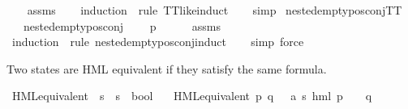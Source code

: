 \begin{isabellebody}
%
\isadelimproof
\ \ %
\endisadelimproof
%
\isatagproof
{}\isamarkupfalse%
\ assms\isanewline
\ \ \isamarkupfalse%
\ {\isacharparenleft}{\kern0pt}induction\ {\isasymphi}\ rule{\isacharcolon}{\kern0pt}\ TT{\isacharunderscore}{\kern0pt}like{\isachardot}{\kern0pt}induct{\isacharparenright}{\kern0pt}\isanewline
\ \ \isamarkupfalse%
\ simp{\isacharplus}{\kern0pt}%
\endisatagproof
{\isafoldproof}%
%
\isadelimproof
\isanewline
%
\endisadelimproof
\isanewline
{}\isamarkupfalse%
\ nested{\isacharunderscore}{\kern0pt}empty{\isacharunderscore}{\kern0pt}pos{\isacharunderscore}{\kern0pt}conj{\isacharunderscore}{\kern0pt}TT{\isacharcolon}{\kern0pt}\isanewline
\ \ \ {\isachardoublequoteopen}nested{\isacharunderscore}{\kern0pt}empty{\isacharunderscore}{\kern0pt}pos{\isacharunderscore}{\kern0pt}conj\ {\isasymphi}{\isachardoublequoteclose}\isanewline
\ \ \ {\isachardoublequoteopen}p\ {\isasymTurnstile}\ {\isasymphi}{\isachardoublequoteclose}\isanewline
%
\isadelimproof
\ \ %
\endisadelimproof
%
\isatagproof
{}\isamarkupfalse%
\ assms\isanewline
\ \ \isamarkupfalse%
\ {\isacharparenleft}{\kern0pt}induction\ {\isasymphi}\ rule{\isacharcolon}{\kern0pt}\ nested{\isacharunderscore}{\kern0pt}empty{\isacharunderscore}{\kern0pt}pos{\isacharunderscore}{\kern0pt}conj{\isachardot}{\kern0pt}induct{\isacharparenright}{\kern0pt}\isanewline
\ \ \isamarkupfalse%
\ {\isacharparenleft}{\kern0pt}simp{\isacharcomma}{\kern0pt}\ force{\isacharparenright}{\kern0pt}%
\endisatagproof
{\isafoldproof}%
%
\isadelimproof
%
\endisadelimproof
%
\begin{isamarkuptext}%
Two states are HML equivalent if they satisfy the same formula.%
\end{isamarkuptext}\isamarkuptrue%
\isamarkupfalse%
\ HML{\isacharunderscore}{\kern0pt}equivalent\ {\isacharcolon}{\kern0pt}{\isacharcolon}{\kern0pt}\ {\isacartoucheopen}{\isacharprime}{\kern0pt}s\ {\isasymRightarrow}\ {\isacharprime}{\kern0pt}s\ {\isasymRightarrow}\ bool{\isacartoucheclose}\ \isanewline
\ \ {\isacartoucheopen}HML{\isacharunderscore}{\kern0pt}equivalent\ p\ q\ {\isasymequiv}\ {\isacharparenleft}{\kern0pt}{\isasymforall}\ {\isasymphi}{\isacharcolon}{\kern0pt}{\isacharcolon}{\kern0pt}{\isacharparenleft}{\kern0pt}{\isacharprime}{\kern0pt}a{\isacharcomma}{\kern0pt}\ {\isacharprime}{\kern0pt}s{\isacharparenright}{\kern0pt}\ hml{\isachardot}{\kern0pt}\ {\isacharparenleft}{\kern0pt}p\ {\isasymTurnstile}\ {\isasymphi}{\isacharparenright}{\kern0pt}\ {\isasymlongleftrightarrow}\ {\isacharparenleft}{\kern0pt}q\ {\isasymTurnstile}\ {\isasymphi}{\isacharparenright}{\kern0pt}{\isacharparenright}{\kern0pt}{\isacartoucheclose}%

\end{isabellebody}
